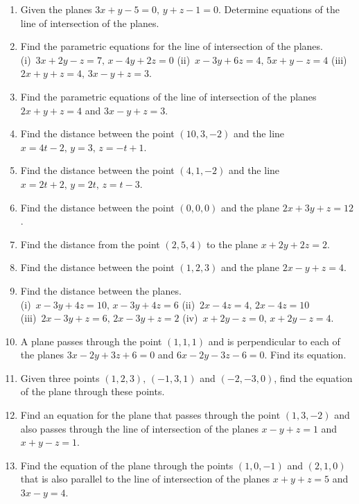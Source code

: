 \documentclass[titlepage,a4paper,12pt]{report}
\begin{document}
\begin{enumerate}
\item Given the planes $3x+y-5=0, \, y+z-1=0$. Determine equations of the line of intersection of the planes.
\item Find the parametric equations for the line of intersection of the planes.\\
(i)\, $3x+2y-z=7, \, x-4y+2z=0$ \quad (ii)\, $x-3y+6z=4, \, 5x+y-z=4$ \quad (iii)\, $2x+y+z=4, \,3x-y+z=3$.
\item Find the parametric equations of the line of intersection of the planes $2x+y+z=4$ and $3x-y+z=3$.
\item Find the distance between the point $(10,3,-2)$ and the line $x=4t-2, \, y=3, \, z=-t+1$.
\item Find the distance between the point $(4,1,-2)$ and the line $x=2t+2, \, y=2t, \, z=t-3$.
\item Find the distance between the point $(0,0,0)$ and the plane $2x+3y+z=12$.
\item Find the distance from the point $(2,5,4)$ to the plane $x+2y+2z=2$.
\item Find the distance between the point $(1,2,3)$ and the plane $2x-y+z=4$.
\item Find the distance between the planes.\\
(i)\, $x-3y+4z=10, \, x-3y+4z=6$ \quad (ii)\, $2x-4z=4, \, 2x-4z=10$\\
(iii)\, $2x-3y+z=6, \, 2x-3y+z=2$ \quad (iv)\, $x+2y-z=0, \, x+2y-z=4$.
\item A plane passes through the point $(1,1,1)$ and is perpendicular to each of the planes $3x-2y+3z+6=0$ and $6x-2y-3z-6=0$. Find its equation.
\item Given three points $(1,2,3), \, (-1,3,1)$ and $(-2,-3,0)$, find the equation of the plane through these points.
\item Find an equation for the plane that passes through the point $(1,3,-2)$ and also passes through the line of intersection of the planes $x-y+z=1$ and $x+y-z=1$.
\item Find the equation of the plane through the points $(1,0,-1)$ and $(2,1,0)$ that is also parallel to the line of intersection of the planes $x+y+z=5$ and $3x-y=4$.
\end{enumerate}
\end{document}

